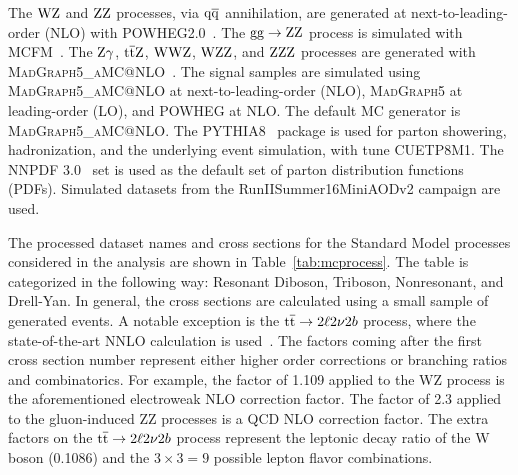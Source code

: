 The $\mathrm{W}\mathrm{Z}$ and $\mathrm{Z}\mathrm{Z}$ processes, via $\mathrm{q}\mathrm{\overline{q}}$ annihilation, 
are generated at next-to-leading-order (NLO) with 
\textsc{POWHEG2.0}~\cite{Alioli:2008gx,Nason:2004rx,Frixione:2007vw,powheg:2010}. 
The $\mathrm{g}\mathrm{g} \to \mathrm{Z}\mathrm{Z}$ process is simulated with MCFM~\cite{MCFM}. 
The $\mathrm{Z}\gamma$, ${\mathrm{t}\overline{\mathrm{t}}} \mathrm{Z}$, $\mathrm{W}\mathrm{W}\mathrm{Z}$, $\mathrm{W}\mathrm{Z}\mathrm{Z}$, and $\mathrm{Z}\mathrm{Z}\mathrm{Z}$ 
processes are generated with \textsc{MadGraph5\_aMC@NLO}~\cite{Alwall:2014hca}.
The signal samples are simulated using \textsc{MadGraph5\_aMC@NLO} at next-to-leading-order (NLO), 
\textsc{MadGraph5} at leading-order (LO), and \textsc{POWHEG} at NLO. The 
default MC generator is \textsc{MadGraph5\_aMC@NLO}. 
The \textsc{PYTHIA8}~\cite{Sjostrand:2006za,Sjostrand:2015} package is used 
for parton showering, hadronization, and the underlying event simulation,
with tune CUETP8M1.
The NNPDF 3.0~\cite{nnpdf} set is used as the default set of parton distribution 
functions (PDFs). 
Simulated datasets from the RunIISummer16MiniAODv2 campaign are used.

The processed dataset names and cross sections for the Standard Model processes considered 
in the analysis are shown in Table~\ref{tab:mcprocess}.
The table is categorized in the following way: Resonant Diboson, Triboson, Nonresonant, and Drell-Yan.
In general, the cross sections are calculated using a small sample of generated events.
A notable exception is the ${\mathrm{t}\overline{\mathrm{t}}} \to 2\ell 2\nu 2b$ process, where the state-of-the-art NNLO calculation is used~\cite{Czakon:2013goa}.
The factors coming after the first cross section number represent either higher order corrections or branching ratios and combinatorics.
For example, the factor of 1.109 applied to the WZ process is the aforementioned electroweak NLO correction factor.
The factor of 2.3 applied to the gluon-induced ZZ processes is a QCD NLO correction factor.
The extra factors on the ${\mathrm{t}\overline{\mathrm{t}}} \to 2\ell 2\nu 2b$ process represent the
leptonic decay ratio of the W boson (0.1086) and the $3\times3=9$ possible lepton flavor combinations.

